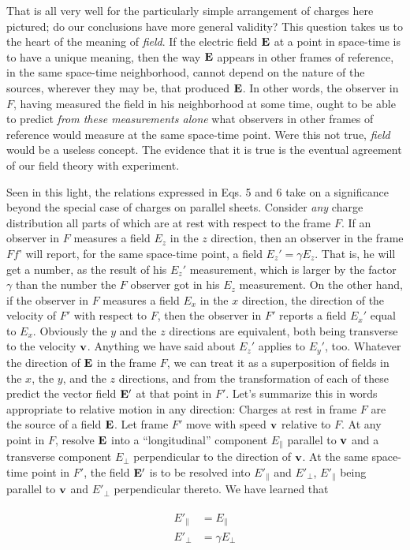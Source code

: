 That is all very well for the particularly simple arrangement of
charges here pictured; do our conclusions have more general validity?
This question takes us to the heart of the meaning of \emph{field}.
If the
electric field $\mathbf{E}$ at a point in space-time is to have a unique meaning,
then the way $\mathbf{E}$ appears in other frames of reference, in the same
space-time neighborhood, cannot depend on the nature of the
sources, wherever they may be, that produced $\mathbf{E}$. In other words,
the observer in $F$, having measured the field in his neighborhood at
some time, ought to be able to predict \emph{from these measurements alone}
what observers in other frames of reference would measure at the
same space-time point. Were this not true, \emph{field} would be a useless
concept. The evidence that it is true is the eventual agreement of
our field theory with experiment.

Seen in this light, the relations expressed in Eqs. 5 and 6 take on
a significance beyond the special case of charges on parallel sheets.
Consider \emph{any} charge distribution all parts of which are at rest with
respect to the frame $F$. If an observer in $F$ measures a field $E_z$ in the
$z$ direction, then an observer in the frame $Ff$' will report, for the same
space-time point, a field $E_z'=\gamma E_z$. That is, he will get a number, as
the result of his $E_z'$ measurement, which is larger by the factor $\gamma$ than
the number the $F$ observer got in his $E_z$ measurement. On the
other hand, if the observer in $F$ measures a field $E_x$ in the $x$ direction,
the direction of the velocity of $F'$ with respect to $F$, then the observer
in $F'$ reports a field $E_x'$ equal to $E_x$. Obviously the $y$ and the $z$ directions
are equivalent, both being transverse to the velocity $\mathbf{v}$. Anything
we have said about $E_z'$ applies to $E_y'$, too. Whatever the direction
of $\mathbf{E}$ in the frame $F$, we can treat it as a superposition of fields in
the $x$, the $y$, and the $z$ directions, and from the transformation of each
of these predict the vector field $\mathbf{E}'$ at that point in $F'$. Let's summarize
this in words appropriate to relative motion in any direction:
Charges at rest in frame $F$ are the source of a field $\mathbf{E}$. Let frame $F'$
move with speed $\mathbf{v}$ relative to $F$. At any point in $F$, resolve $\mathbf{E}$ into a
``longitudinal'' component $E_\parallel$ parallel to $\mathbf{v}$ and a transverse component
$E_\perp$ perpendicular to the direction of $\mathbf{v}$. At the same space-time
point in $F'$, the field $\mathbf{E}'$ is to be resolved into $E'_\parallel$ and $E'_\perp$,
$E'_\parallel$ being
parallel to $\mathbf{v}$ and $E'_\perp$ perpendicular thereto. We have learned that
\begin{framed}
\begin{align}
  \begin{split}
    E'_\parallel &= E_\parallel \\
    E'_\perp     &= \gamma E_\perp
  \end{split}
\end{align}
\end{framed}

